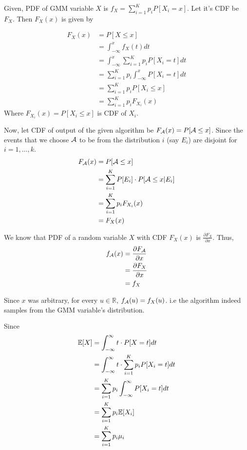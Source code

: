 \begin{solution}


	Given, PDF of GMM variable $X$ is $f_X = \sum_{i=1}^K p_iP[X_i=x]$. Let
	it's CDF be $F_X$. Then $F_X(x)$ is given by

	\begin{align}
		F_X(x) & = P[X\leq x]                                    \\
		       & = \int_{-\infty}^{x} f_X(t)dt                   \\
		       & = \int_{-\infty}^{x} \sum_{i=1}^K p_iP[X_i=t]dt \\
		       & = \sum_{i=1}^K p_i\int_{-\infty}^{x} P[X_i=t]dt \\
		       & = \sum_{i=1}^K p_iP[X_i\leq x]                  \\
		       & = \sum_{i=1}^K p_iF_{X_i}(x)
	\end{align}
	Where $F_{X_i}(x) = P[X_i\leq x]$ is CDF of $X_i$.

	Now, let CDF of output of the given algorithm be
	$F_{\mathcal{A}}(x) = P[\mathcal{A}\leq x]$. Since the events that we choose $\mathcal{A}$ to be
	from the distribution $i$ (say $E_i$) are disjoint for $i=1,\dots,k$.
	\begin{align}
		F_{\mathcal{A}}(x) & = P[\mathcal{A}\leq x]                                \\
		        & = \sum_{i=1}^K P[E_i]\cdot P[\mathcal{A}\leq x | E_i] \\
		        & = \sum_{i=1}^K p_iF_{X_i}(x)                 \\
		        & = F_X(x)
	\end{align}

	We know that PDF of a random variable $X$ with CDF $F_X(x)$ is
	$\frac{\partial F_X}{\partial x}$. Thus,
	\begin{align}
		f_{\mathcal{A}}(x) & = \frac{\partial F_{\mathcal{A}}}{\partial x} \\
		        & = \frac{\partial F_X}{\partial x}  \\
		        & = f_X
	\end{align}

	Since $x$ was arbitrary, for every $u\in\mathbb{R}$, $f_{\mathcal{A}}(u) =
		f_X(u)$. i.e the algorithm indeed samples from the GMM variable's
	distribution.



	Since
	\begin{align}
		\mathbb{E}[X] & = \int_{-\infty}^{\infty} t\cdot P[X=t]dt                    \\
		      & = \int_{-\infty}^{\infty} t\cdot \sum_{i=1}^K p_iP[X_i=t] dt \\
		      & = \sum_{i=1}^K p_i \int_{-\infty}^{\infty} P[X_i = t] dt     \\
		      & = \sum_{i=1}^K p_i \mathbb{E}[X_i]                                   \\
		      & = \sum_{i=1}^K p_i\mu_i
	\end{align}


\end{solution}
